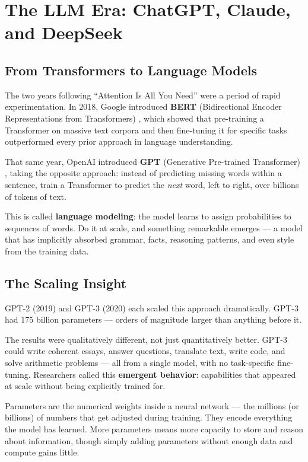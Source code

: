 \section{The LLM Era: ChatGPT, Claude, and DeepSeek}

\subsection{From Transformers to Language Models}

The two years following ``Attention Is All You Need'' were a period of rapid experimentation.
In 2018, Google introduced \textbf{BERT} (Bidirectional Encoder Representations from Transformers) \cite{devlin2018bert}, which showed that pre-training a Transformer on massive text corpora and then fine-tuning it for specific tasks outperformed every prior approach in language understanding.

That same year, OpenAI introduced \textbf{GPT} (Generative Pre-trained Transformer) \cite{radford2018improving}, taking the opposite approach: instead of predicting missing words within a sentence, train a Transformer to predict the \emph{next} word, left to right, over billions of tokens of text.

This is called \textbf{language modeling}: the model learns to assign probabilities to sequences of words.
Do it at scale, and something remarkable emerges --- a model that has implicitly absorbed grammar, facts, reasoning patterns, and even style from the training data.

\subsection{The Scaling Insight}

GPT-2 (2019) and GPT-3 (2020) \cite{brown2020language} each scaled this approach dramatically.
GPT-3 had 175 billion parameters --- orders of magnitude larger than anything before it.

The results were qualitatively different, not just quantitatively better.
GPT-3 could write coherent essays, answer questions, translate text, write code, and solve arithmetic problems --- all from a single model, with no task-specific fine-tuning.
Researchers called this \textbf{emergent behavior}: capabilities that appeared at scale without being explicitly trained for.

\begin{tcolorbox}[colback=blue!5!white, colframe=blue!40!black, title=What Are Parameters?]
Parameters are the numerical weights inside a neural network --- the millions (or billions) of numbers that get adjusted during training.
They encode everything the model has learned.
More parameters means more capacity to store and reason about information, though simply adding parameters without enough data and compute gains little.
\end{tcolorbox}

